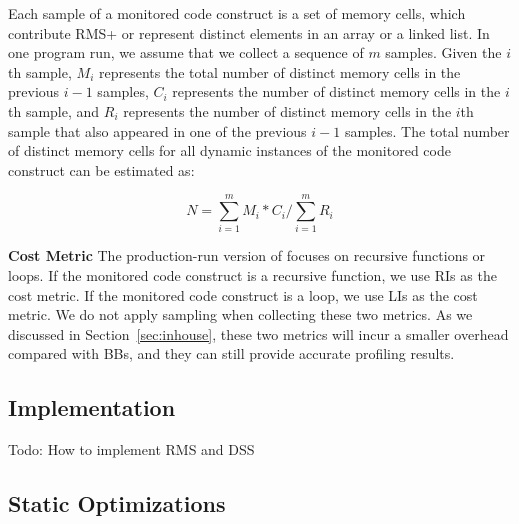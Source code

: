 Each sample of a monitored code construct is a set of memory cells, 
which contribute RMS+ or represent distinct elements in an array or a linked list. 
In one program run, we assume that we collect a sequence of $m$ samples. 
Given the $i$th sample, $M_i$ represents the 
total number of distinct memory cells in the previous $i-1$ samples, 
$C_i$ represents the number of distinct memory cells in the $i$th sample,
and $R_i$ represents the number of distinct memory cells in 
the $i$th sample that also appeared in one of the previous $i-1$ samples.
The total number of distinct memory cells for all dynamic instances 
of the monitored code construct can be estimated as:



\begin{equation} \label{eq:mark}
N = \sum\limits_{i=1}^m M_i*C_i\Big/\sum\limits_{i=1}^m R_i
\end{equation}

\noindent\textbf{Cost Metric}
The production-run version of \Tool focuses on recursive functions or loops.
If the monitored code construct is a recursive function,
we use RIs as the cost metric.
If the monitored code construct is a loop, 
we use LIs as the cost metric. 
We do not apply sampling when collecting these two metrics. 
As we discussed in Section~\ref{sec:inhouse},
these two metrics will incur a smaller overhead compared with BBs, 
and they can still provide accurate profiling results.  


\subsection{Implementation}

{\color{red} Todo: How to implement RMS and DSS}

\subsection{Static Optimizations}













